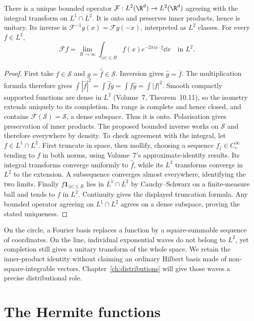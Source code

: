 \begin{theorem}[Plancherel, 1910]\label{thm:plancherel}
There is a unique bounded operator $\mathcal F:L^2(\R^d)\to L^2(\R^d)$ agreeing with the integral transform on $L^1\cap L^2$. It is onto and preserves inner products, hence is unitary. Its inverse is $\mathcal F^{-1}g(x)=\mathcal Fg(-x)$, interpreted as $L^2$ classes. For every $f\in L^2$,
\[
\mathcal Ff=\lim_{R\to\infty}\int_{|x|\le R}f(x)e^{-2\pi ix\cdot\xi}\dd x
\quad\text{in }L^2.
\]
\end{theorem}
\begin{proof}
First take $f\in\mathcal S$ and $g=\overline{\hat f}\in\mathcal S$. Inversion gives $\hat g=\bar f$. The multiplication formula therefore gives
$\int|\hat f|^2=\int\hat f g=\int f\hat g=\int|f|^2$.
Smooth compactly supported functions are dense in $L^2$ (Volume~7, Theorem~10.11), so the isometry extends uniquely to its completion. Its range is complete and hence closed, and contains $\mathcal F(\mathcal S)=\mathcal S$, a dense subspace. Thus it is onto. Polarisation gives preservation of inner products. The proposed bounded inverse works on $\mathcal S$ and therefore everywhere by density.
To check agreement with the integral, let $f\in L^1\cap L^2$. First truncate in space, then mollify, choosing a sequence $f_j\in C_c^\infty$ tending to $f$ in both norms, using Volume~7's approximate-identity results. Its integral transforms converge uniformly to $\hat f$, while its $L^2$ transforms converge in $L^2$ to the extension. A subsequence converges almost everywhere, identifying the two limits. Finally $f\mathbf1_{|x|\le R}$ lies in $L^1\cap L^2$ by Cauchy--Schwarz on a finite-measure ball and tends to $f$ in $L^2$. Continuity gives the displayed truncation formula. Any bounded operator agreeing on $L^1\cap L^2$ agrees on a dense subspace, proving the stated uniqueness.
\end{proof}

\begin{beauty}
On the circle, a Fourier basis replaces a function by a square-summable sequence of coordinates. On the line, individual exponential waves do not belong to $L^2$, yet completion still gives a unitary transform of the whole space. We retain the inner-product identity without claiming an ordinary Hilbert basis made of non-square-integrable vectors. Chapter~\ref{ch:distributions} will give those waves a precise distributional role.
\end{beauty}

\section{The Hermite functions}

